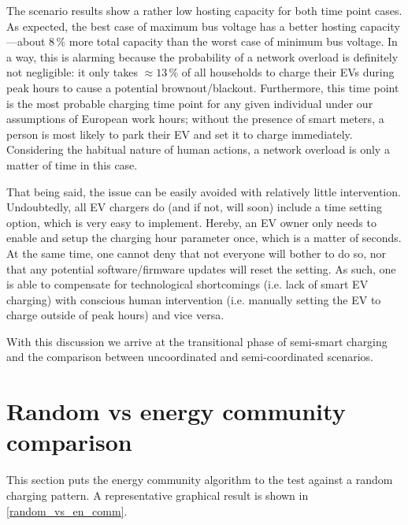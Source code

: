 \documentclass[a4paper,10pt]{report}
\begin{document}
The scenario results show a rather low hosting capacity for both time point cases. As expected, the best case of maximum bus voltage has a better hosting capacity---about $8\,\%$ more total capacity than the worst case of minimum bus voltage. In a way, this is alarming because the probability of a network overload is definitely not negligible: it only takes $\approx13\,\%$ of all households to charge their EVs during peak hours to cause a potential brownout/blackout. Furthermore, this time point is the most probable charging time point for any given individual under our assumptions of European work hours; without the presence of smart meters, a person is most likely to park their EV and set it to charge immediately. Considering the habitual nature of human actions, a network overload is only a matter of time in this case.

That being said, the issue can be easily avoided with relatively little intervention. Undoubtedly, all EV chargers do (and if not, will soon) include a time setting option, which is very easy to implement. Hereby, an EV owner only needs to enable and setup the charging hour parameter once, which is a matter of seconds. At the same time, one cannot deny that not everyone will bother to do so, nor that any potential software/firmware updates will reset the setting. As such, one is able to compensate for technological shortcomings (i.e. lack of smart EV charging) with conscious human intervention (i.e. manually setting the EV to charge outside of peak hours) and vice versa.

With this discussion we arrive at the transitional phase of semi-smart charging and the comparison between uncoordinated and semi-coordinated scenarios.


\section{Random vs energy community comparison}\label{section_rand_vs_comm}
This section puts the energy community algorithm to the test against a random charging pattern. A representative graphical result is shown in \cref{random_vs_en_comm}.
\end{document}
